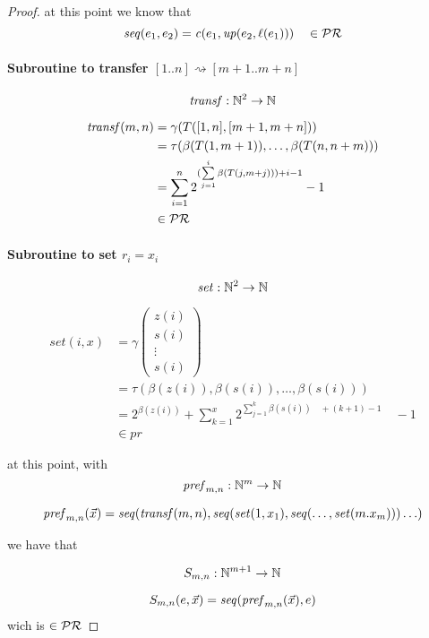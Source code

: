 \begin{theorem}
\begin{proof}
    at this point we know that
    \[
      \mathit{seq}({e_1, e_2}) = \mathit{c}({e_1, \mathit{up}({e_2, \ell(e_1)})}) \quad \in \mathcal{PR}
    \]

    \paragraph{\textbf{Subroutine to transfer $[1 .. n] \rightsquigarrow [m+1 .. m+n]$}}
    \newcommand{\tran}[1]{\ensuremath{\mathit{transf}({#1})}}
    \[
      \mathit{transf}: \mathbb{N}^2 \rightarrow \mathbb{N}
    \]

    \[
      \begin{aligned}
        \tran{m,n} &= \gamma(T([1,n],[m+1, m+n])) \\
        &= \tau(\beta(T(1,m+1)), \dots, \beta(T(n,n+m))) \\
        &= \sum\limits^n_{i=1}2^{(\sum\limits^i_{j=1}\beta(T(j,m+j))) + i - 1}-1 \\
        &\in \pr
      \end{aligned}
    \]

    \paragraph{\textbf{Subroutine to set $r_i = x_i$}}
    \newcommand{\set}[1]{\ensuremath{\mathit{set}({#1})}}
    \[
      \mathit{set} : \mathbb{N}^2 \rightarrow \mathbb{N}
    \]

    \[
      \begin{aligned}
        \set{i,x} &= \gamma\left( \begin{array}{c}
                                    z(i) \\
                                    s(i) \\
                                    \vdots \\
                                    s(i)
                                  \end{array} \right) \\
        &= \tau(\beta(z(i)), \beta(s(i)), \dots, \beta(s(i))) \\
        &= 2^{\beta(z(i))} + \sum^x_{k=1}2^{\sum\limits^k_{j=1}\beta(s(i)) \quad + (k+1)-1} \quad -1 \\
        &\in pr
      \end{aligned}
    \]

    at this point, with
    \newcommand{\pref}[1]{\ensuremath{\mathit{pref}_{m,n}({#1})}}
    \[
      \mathit{pref}_{m,n}: \mathbb{N}^m \rightarrow \mathbb{N}
    \]

    \[
      \pref{\vec{x}} = \seq{\tran{m,n}, \seq{\set{1,x_1}, \seq{\dots , \set{m.x_m}}} \dots}
    \]

    we have that

    \[
      S_{m,n}: \mathbb{N}^{m+1} \rightarrow \mathbb{N}
    \]

    \[
      S_{m,n}(e, \vec{x}) = \seq{\pref{\vec{x}}, e}
    \]
    wich is $\in \mathcal{PR}$
  \end{proof}
\end{theorem}

